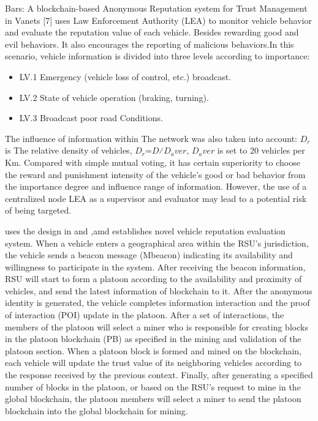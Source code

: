 Bars: A blockchain-based Anonymous Reputation system for Trust Management in Vanets [7] uses Law Enforcement Authority (LEA) to monitor vehicle behavior and evaluate the reputation value of each vehicle. Besides rewarding good and evil behaviors. It also encourages the reporting of malicious behaviors.In this scenario, vehicle information is divided into three levels according to importance:
\begin{itemize}
	\item{LV.1 Emergency (vehicle loss of control, etc.) broadcast.}
	\item{LV.2 State of vehicle operation (braking, turning).}
	\item{LV.3 Broadcast poor road Conditions.}
\end{itemize}
The influence of information within The network was also taken into account: $D_r$ is The relative density of vehicles, $D_r$=$D$⁄$D_aver$, $D_aver$ is set to 20 vehicles per Km. Compared with simple mutual voting, it has certain superiority to choose the reward and punishment intensity of the vehicle's good or bad behavior from the importance degree and influence range of information. However, the use of a centralized node LEA as a supervisor and evaluator may lead to a potential risk of being targeted.

\cite{ref48} uses the design in \cite{ref45} and \cite{ref2} ,amd establishes novel vehicle reputation evaluation system. When a vehicle enters a geographical area within the RSU's jurisdiction, the vehicle sends a beacon message (Mbeacon) indicating its availability and willingness to participate in the system. After receiving the beacon information, RSU will start to form a platoon according to the availability and proximity of vehicles, and send the latest information of blockchain to it. After the anonymous identity is generated, the vehicle completes information interaction and the proof of interaction (POI) update in the platoon. After a set of interactions, the members of the platoon will select a miner who is responsible for creating blocks in the platoon blockchain (PB) as specified in the mining and validation of the platoon section. When a platoon block is formed and mined on the blockchain, each vehicle will update the trust value of its neighboring vehicles according to the response received by the previous context. Finally, after generating a specified number of blocks in the platoon, or based on the RSU’s request to mine in the global blockchain, the platoon members will select a miner to send the platoon blockchain into the global blockchain for mining.

